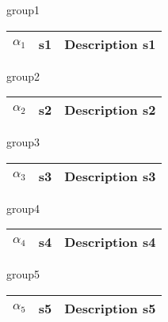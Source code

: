 group1

\begin{tabular}{lll}
\hline
$\alpha_1$ & s1 & Description s1\tabularnewline
\hline
\end{tabular}
 
group2

\begin{tabular}{lll}
\hline
$\alpha_2$ & s2 & Description s2\tabularnewline
\hline
\end{tabular}
 
group3

\begin{tabular}{lll}
\hline
$\alpha_3$ & s3 & Description s3\tabularnewline
\hline
\end{tabular}
 
group4

\begin{tabular}{lll}
\hline
$\alpha_4$ & s4 & Description s4\tabularnewline
\hline
\end{tabular}
 
group5

\begin{tabular}{lll}
\hline
$\alpha_5$ & s5 & Description s5\tabularnewline
\hline
\end{tabular}
 
